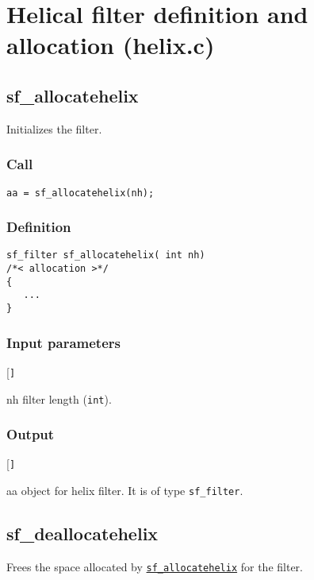 \section{Helical filter definition and allocation (helix.c)}




\subsection{{sf\_allocatehelix}}\label{sec:sf_allocatehelix}
Initializes the filter.

\subsubsection*{Call}
\begin{verbatim}aa = sf_allocatehelix(nh);\end{verbatim}

\subsubsection*{Definition}
\begin{verbatim}
sf_filter sf_allocatehelix( int nh) 
/*< allocation >*/
{
   ...
}
\end{verbatim}

\subsubsection*{Input parameters}
\begin{desclist}{\tt }{\quad}[\tt ]
   \setlength\itemsep{0pt}
   \item[nh] filter length (\texttt{int}).  
\end{desclist}

\subsubsection*{Output}
\begin{desclist}{\tt }{\quad}[\tt ]
   \setlength\itemsep{0pt}  
   \item[aa] object for helix filter. It is of type \texttt{sf\_filter}.
\end{desclist}




\subsection{{sf\_deallocatehelix}}
Frees the space allocated by \hyperref[sec:sf_allocatehelix]{\texttt{sf\_allocatehelix}} for the filter.

